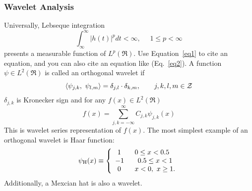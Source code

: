 \documentclass[referee]{raa}            %
\begin{document}
\subsubsection{Wavelet Analysis}
Universally, Lebseque integration
\begin{equation}\label{eq1}
  \int_{\infty}^{\infty}|h(t)|^{p} dt < \infty, ~~~~~~1\leq p < \infty
\end{equation}
presents a measurable function of $L^{p}(\Re)$. Use Equation~\eqref{eq1} to cite an equation, and you can also cite an equation like (Eq.~\eqref{eq2}). 
A function $\psi \in L^{2}(\Re)$ is called an orthogonal wavelet if
\begin{equation}\label{eq2}
  \langle\psi_{j,k},~\psi_{l,m}\rangle = \delta_{j,l}\cdot\delta_{k,m}, ~~~~~~j,k,l,m\in{\cal Z}
\end{equation}
$\delta_{j,k}$ is Kronecker sign and for any $f(x) \in L^{2}(\Re)$
\begin{equation}\label{eq3}
  f(x)= \sum_{j,k=-\infty}^{\infty} C_{j,k} \psi_{j,k}(x)
\end{equation}
This is wavelet series representation of $f(x)$. The most simplest
example of an orthogonal wavelet is Haar function:
\begin{equation}\label{eq4}
  \psi_{\rm H}(x) \equiv \left\lbrace \begin{array}{ll}~1 ~~~~~~0\leq x <0.5\\
                                              -1 ~~~~~~0.5\leq x < 1 \\
                                              ~0 ~~~~~~x<0,~x\geq 1.
                             \end{array} \right.
\end{equation}
Additionally, a Mexcian hat is also a wavelet.
\end{document}
